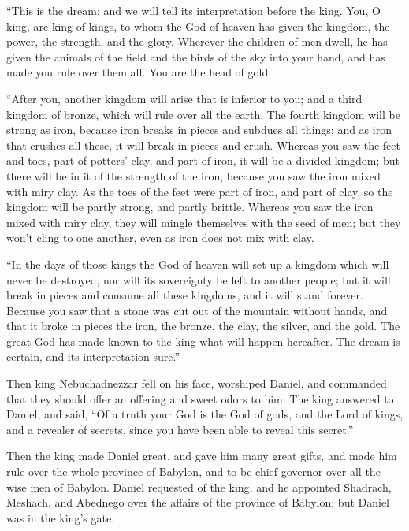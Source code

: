  ``This is the dream; and we will tell its interpretation
before the king.  You, O king, are king of kings, to whom
the God of heaven has given the kingdom, the power, the strength, and
the glory.  Wherever the children of men dwell, he has
given the animals of the field and the birds of the sky into your hand,
and has made you rule over them all. You are the head of gold.

 ``After you, another kingdom will arise that is inferior
to you; and a third kingdom of bronze, which will rule over all the
earth.  The fourth kingdom will be strong as iron, because
iron breaks in pieces and subdues all things; and as iron that crushes
all these, it will break in pieces and crush.  Whereas you
saw the feet and toes, part of potters' clay, and part of iron, it will
be a divided kingdom; but there will be in it of the strength of the
iron, because you saw the iron mixed with miry clay.  As
the toes of the feet were part of iron, and part of clay, so the kingdom
will be partly strong, and partly brittle.  Whereas you saw
the iron mixed with miry clay, they will mingle themselves with the seed
of men; but they won't cling to one another, even as iron does not mix
with clay.

 ``In the days of those kings the God of heaven will set up
a kingdom which will never be destroyed, nor will its sovereignty be
left to another people; but it will break in pieces and consume all
these kingdoms, and it will stand forever.  Because you saw
that a stone was cut out of the mountain without hands, and that it
broke in pieces the iron, the bronze, the clay, the silver, and the
gold. The great God has made known to the king what will happen
hereafter. The dream is certain, and its interpretation sure.''

 Then king Nebuchadnezzar fell on his face, worshiped
Daniel, and commanded that they should offer an offering and sweet odors
to him.  The king answered to Daniel, and said, ``Of a
truth your God is the God of gods, and the Lord of kings, and a revealer
of secrets, since you have been able to reveal this secret.''

 Then the king made Daniel great, and gave him many great
gifts, and made him rule over the whole province of Babylon, and to be
chief governor over all the wise men of Babylon.  Daniel
requested of the king, and he appointed Shadrach, Meshach, and Abednego
over the affairs of the province of Babylon; but Daniel was in the
king's gate.


